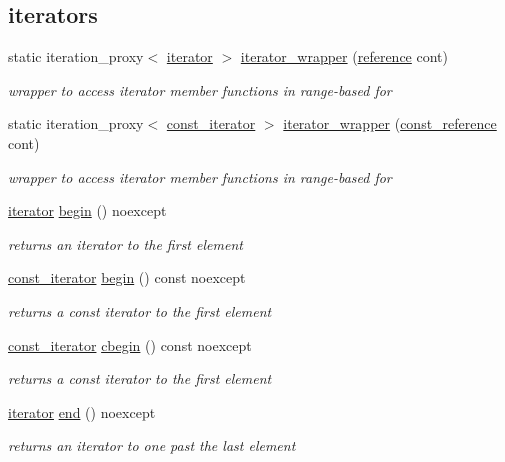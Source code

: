 \subsection*{iterators}
\begin{DoxyCompactItemize}
\item 
static iteration\+\_\+proxy$<$ \hyperlink{a00079}{iterator} $>$ \hyperlink{a00025_ab936779c70bec68343ef440ed13251e5}{iterator\+\_\+wrapper} (\hyperlink{a00025_a3ec8e17be8732fe436e9d6733f52b7a3}{reference} cont)
\begin{DoxyCompactList}\small\item\em wrapper to access iterator member functions in range-\/based for \end{DoxyCompactList}\item 
static iteration\+\_\+proxy$<$ \hyperlink{a00038}{const\+\_\+iterator} $>$ \hyperlink{a00025_af148cdab12df5bf86119fac735ccaac5}{iterator\+\_\+wrapper} (\hyperlink{a00025_af677a29b0e66edc9f66e5167e4667071}{const\+\_\+reference} cont)
\begin{DoxyCompactList}\small\item\em wrapper to access iterator member functions in range-\/based for \end{DoxyCompactList}\item 
\hyperlink{a00079}{iterator} \hyperlink{a00025_ad4e381c54039607be08d7af41a1f6ad1}{begin} () noexcept
\begin{DoxyCompactList}\small\item\em returns an iterator to the first element \end{DoxyCompactList}\item 
\hyperlink{a00038}{const\+\_\+iterator} \hyperlink{a00025_a86a477c16dac3bdd4929fee2db394256}{begin} () const  noexcept
\begin{DoxyCompactList}\small\item\em returns a const iterator to the first element \end{DoxyCompactList}\item 
\hyperlink{a00038}{const\+\_\+iterator} \hyperlink{a00025_aa7205e1926d3aea98adeced91b0ff5fb}{cbegin} () const  noexcept
\begin{DoxyCompactList}\small\item\em returns a const iterator to the first element \end{DoxyCompactList}\item 
\hyperlink{a00079}{iterator} \hyperlink{a00025_a12ccf14d39ddae52f6c7e126105a230b}{end} () noexcept
\begin{DoxyCompactList}\small\item\em returns an iterator to one past the last element \end{DoxyCompactList}\item 

\end{DoxyCompactItemize}
